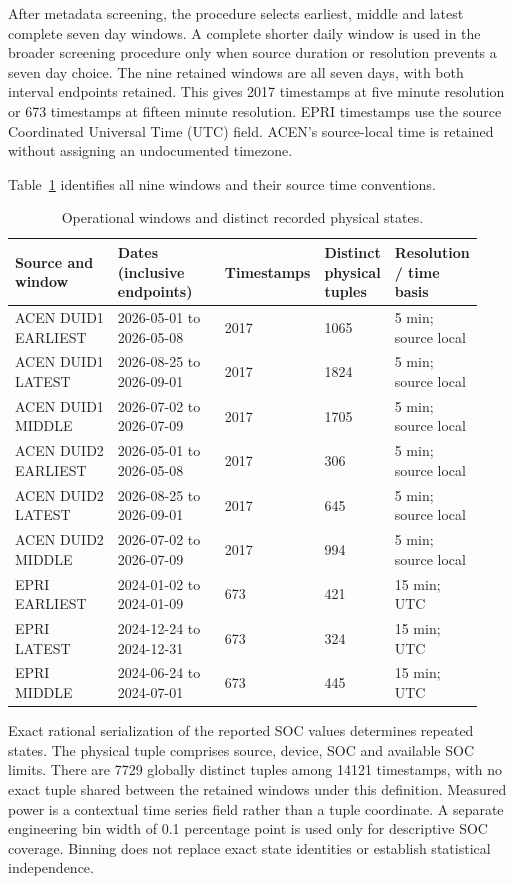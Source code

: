 After metadata screening, the procedure selects earliest, middle and latest
complete seven day windows. A complete shorter daily window is used in
the broader screening procedure only when source duration or resolution
prevents a seven day choice. The nine retained windows are all seven days,
with both interval endpoints retained. This gives 2017 timestamps at five
minute resolution or 673 timestamps at fifteen minute resolution. EPRI
timestamps use the source Coordinated Universal Time (UTC) field. ACEN's source-local time is retained
without assigning an undocumented timezone.

Table~\ref{tab:windows} identifies all nine windows and their source time conventions.
\begingroup
\begin{longtable}{@{}p{0.24\linewidth}p{0.25\linewidth}p{0.11\linewidth}p{0.15\linewidth}p{0.18\linewidth}@{}}
\caption{Operational windows and distinct recorded physical states.}\label{tab:windows}\\
\toprule Source and window & Dates (inclusive endpoints) & Timestamps & Distinct physical tuples & Resolution / time basis\\
\midrule\bottomrule
ACEN DUID1 EARLIEST & 2026-05-01 to 2026-05-08 & 2017 & 1065 & 5 min; source local\\
ACEN DUID1 LATEST & 2026-08-25 to 2026-09-01 & 2017 & 1824 & 5 min; source local\\
ACEN DUID1 MIDDLE & 2026-07-02 to 2026-07-09 & 2017 & 1705 & 5 min; source local\\
ACEN DUID2 EARLIEST & 2026-05-01 to 2026-05-08 & 2017 & 306 & 5 min; source local\\
ACEN DUID2 LATEST & 2026-08-25 to 2026-09-01 & 2017 & 645 & 5 min; source local\\
ACEN DUID2 MIDDLE & 2026-07-02 to 2026-07-09 & 2017 & 994 & 5 min; source local\\
EPRI EARLIEST & 2024-01-02 to 2024-01-09 & 673 & 421 & 15 min; UTC\\
EPRI LATEST & 2024-12-24 to 2024-12-31 & 673 & 324 & 15 min; UTC\\
EPRI MIDDLE & 2024-06-24 to 2024-07-01 & 673 & 445 & 15 min; UTC\\
\end{longtable}

\endgroup


Exact rational serialization of the reported SOC values determines repeated
states. The physical tuple comprises source, device, SOC and available SOC
limits. There are 7729 globally distinct tuples among 14121 timestamps, with
no exact tuple shared between the retained windows under this definition.
Measured power is a contextual time series field rather than a tuple
coordinate. A separate engineering bin width of 0.1 percentage point is
used only for descriptive SOC coverage. Binning does not replace exact
state identities or establish statistical independence.

